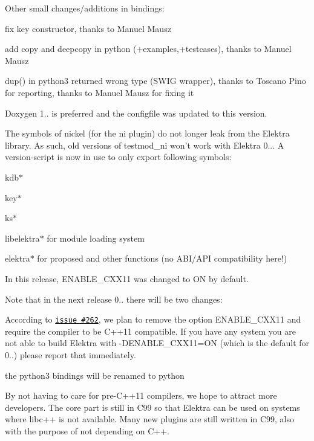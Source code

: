 Other small changes/additions in bindings\+:


\begin{DoxyItemize}
\item fix key constructor, thanks to Manuel Mausz
\item add copy and deepcopy in python (+examples,+testcases), thanks to Manuel Mausz
\item dup() in python3 returned wrong type (S\+W\+I\+G wrapper), thanks to Toscano Pino for reporting, thanks to Manuel Mausz for fixing it
\end{DoxyItemize}

Doxygen 1.. is preferred and the configfile was updated to this version.

The symbols of nickel (for the ni plugin) do not longer leak from the Elektra library. As such, old versions of testmod\+\_\+ni won't work with Elektra 0... A version-\/script is now in use to only export following symbols\+:


\begin{DoxyItemize}
\item kdb$\ast$
\item key$\ast$
\item ks$\ast$
\item libelektra$\ast$ for module loading system
\item elektra$\ast$ for proposed and other functions (no A\+B\+I/\+A\+P\+I compatibility here!)
\end{DoxyItemize}

In this release, E\+N\+A\+B\+L\+E\+\_\+\+C\+X\+X11 was changed to {\ttfamily O\+N} by default.

Note that in the next release 0.. there will be two changes\+:


\begin{DoxyItemize}
\item According to \href{http://git.libelektra.org/issues/262}{\tt issue \#262}, we plan to remove the option E\+N\+A\+B\+L\+E\+\_\+\+C\+X\+X11 and require the compiler to be C++11 compatible. If you have any system you are not able to build Elektra with -\/\+D\+E\+N\+A\+B\+L\+E\+\_\+\+C\+X\+X11=O\+N (which is the default for 0..) please report that immediately.
\item the python3 bindings will be renamed to python
\end{DoxyItemize}

By not having to care for pre-\/\+C++11 compilers, we hope to attract more developers. The core part is still in C99 so that Elektra can be used on systems where libc++ is not available. Many new plugins are still written in C99, also with the purpose of not depending on C++.

